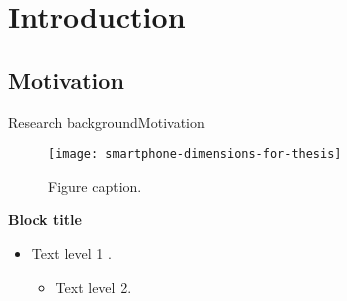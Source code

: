 \section{Introduction}
\subsection{Motivation}
\begin{frame}{Research background}{Motivation}
\small
\begin{figure}[tb]
  \centering
  \texttt{[image: smartphone-dimensions-for-thesis]}
  \caption{Figure caption.}  
\end{figure}

\begin{block}{\small \textbf{Block title}}
  \begin{itemize}
  \item Text level 1 \cite{Berry2011}.
  \begin{itemize}
    \item Text level 2.
  \end{itemize}
\end{itemize}
\end{block}
\end{frame}
